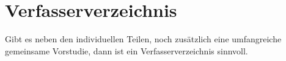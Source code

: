 \chapter{Verfasserverzeichnis}

Gibt es neben den individuellen Teilen, noch zusätzlich eine umfangreiche gemeinsame Vorstudie, dann ist ein Verfasserverzeichnis sinnvoll.

